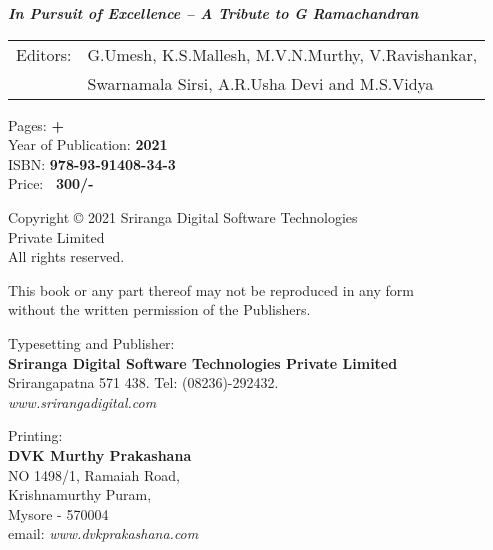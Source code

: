 \thispagestyle{empty}
\noindent
{\sl\bfseries In Pursuit of Excellence – A Tribute to  G Ramachandran}
\medskip

\noindent
\begin{tabular}{@{}ll@{}}
Editors: & G.Umesh, K.S.Mallesh, M.V.N.Murthy, V.Ravishankar,\\ 
         & Swarnamala Sirsi, A.R.Usha Devi and M.S.Vidya 
\end{tabular}
\vfill

\noindent
Pages: {\bf \pageref{prelims} + \pageref{bookend}}\\
Year of Publication: {\bf 2021}\\
ISBN: {\bf 978-93-91408-34-3}\\
Price: {\bf \rupee\ 300/-}
\vfill

\noindent
Copyright © 2021 Sriranga Digital Software Technologies\\ Private Limited\\
All rights reserved.
\vfill

\noindent
This book or any part thereof may not be reproduced in any form\\ without the written permission of the Publishers.
\vfill

\noindent
Typesetting and Publisher:\\
{\bf Sriranga Digital Software Technologies Private Limited}\\ 
Srirangapatna 571 438. Tel: (08236)-292432.\\
{\sl www.srirangadigital.com}\\
\vfill

\noindent
Printing:\\
{\bf DVK Murthy Prakashana}\\
NO 1498/1, Ramaiah Road,\\ 
Krishnamurthy Puram,\\ 
Mysore - 570004\\
email: {\sl www.dvkprakashana.com}
